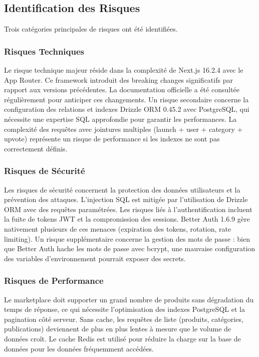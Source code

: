 \subsection{Identification des Risques}

Trois catégories principales de risques ont été identifiées.

\subsubsection{Risques Techniques}

Le risque technique majeur réside dans la complexité de Next.js 16.2.4 avec le App Router. Ce framework introduit des breaking changes significatifs par rapport aux versions précédentes. La documentation officielle a été consultée régulièrement pour anticiper ces changements. Un risque secondaire concerne la configuration des relations et indexes Drizzle ORM 0.45.2 avec PostgreSQL, qui nécessite une expertise SQL approfondie pour garantir les performances. La complexité des requêtes avec jointures multiples (launch + user + category + upvote) représente un risque de performance si les indexes ne sont pas correctement définis.

\subsubsection{Risques de Sécurité}

Les risques de sécurité concernent la protection des données utilisateurs et la prévention des attaques. L'injection SQL est mitigée par l'utilisation de Drizzle ORM avec des requêtes paramétrées. Les risques liés à l'authentification incluent la fuite de tokens JWT et la compromission des sessions. Better Auth 1.6.9 gère nativement plusieurs de ces menaces (expiration des tokens, rotation, rate limiting). Un risque supplémentaire concerne la gestion des mots de passe : bien que Better Auth hache les mots de passe avec bcrypt, une mauvaise configuration des variables d'environnement pourrait exposer des secrets.

\subsubsection{Risques de Performance}

Le marketplace doit supporter un grand nombre de produits sans dégradation du temps de réponse, ce qui nécessite l'optimisation des indexes PostgreSQL et la pagination côté serveur. Sans cache, les requêtes de liste (produits, catégories, publications) deviennent de plus en plus lentes à mesure que le volume de données croît. Le cache Redis est utilisé pour réduire la charge sur la base de données pour les données fréquemment accédées.

